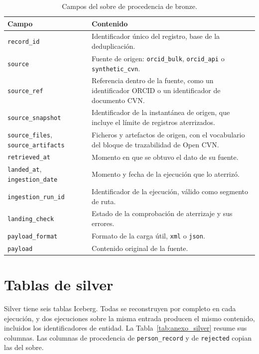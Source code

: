 \begin{table}[H]
  \centering
  \footnotesize
  \renewcommand{\arraystretch}{1.1}
  \begin{tabular}{
    >{\raggedright\arraybackslash}p{}
    >{\raggedright\arraybackslash}p{}}
    \hline
    \textbf{Campo} & \textbf{Contenido} \\
    \hline
    \texttt{record\_id} & Identificador único del registro, base de la deduplicación. \\
    \texttt{source} & Fuente de origen: \texttt{orcid\_bulk}, \texttt{orcid\_api} o \texttt{synthetic\_cvn}. \\
    \texttt{source\_ref} & Referencia dentro de la fuente, como un identificador ORCID o un identificador de documento CVN. \\
    \texttt{source\_snapshot} & Identificador de la instantánea de origen, que incluye el límite de registros aterrizados. \\
    \texttt{source\_files}, \texttt{source\_artifacts} & Ficheros y artefactos de origen, con el vocabulario del bloque de trazabilidad de Open CVN. \\
    \texttt{retrieved\_at} & Momento en que se obtuvo el dato de su fuente. \\
    \texttt{landed\_at}, \texttt{ingestion\_date} & Momento y fecha de la ejecución que lo aterrizó. \\
    \texttt{ingestion\_run\_id} & Identificador de la ejecución, válido como segmento de ruta. \\
    \texttt{landing\_check} & Estado de la comprobación de aterrizaje y sus errores. \\
    \texttt{payload\_format} & Formato de la carga útil, \texttt{xml} o \texttt{json}. \\
    \texttt{payload} & Contenido original de la fuente. \\
    \hline
  \end{tabular}
  \caption{Campos del sobre de procedencia de bronze.}
  \label{tab:anexo_sobre}
\end{table}

\section{Tablas de silver}
\label{sec:anexo_modelo_silver}

Silver tiene seis tablas Iceberg. Todas se reconstruyen por completo en cada
ejecución, y dos ejecuciones sobre la misma entrada producen el mismo
contenido, incluidos los identificadores de entidad. La
Tabla~\ref{tab:anexo_silver} resume sus columnas. Las columnas de
procedencia de \texttt{person\_record} y de \texttt{rejected} copian las del
sobre.

